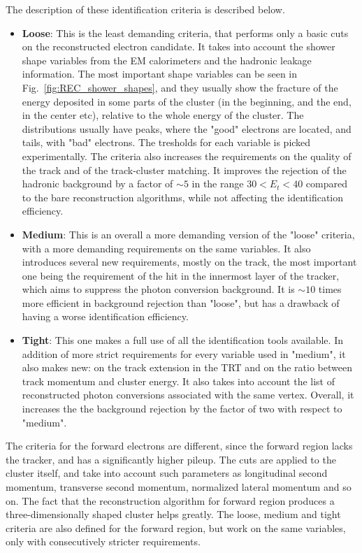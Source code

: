 The description of these identification criteria is described below.
\begin{itemize}
\item {\bfseries Loose}: This is the least demanding criteria, that performs only a basic cuts on the reconstructed electron candidate. It takes into account the shower shape variables from the EM calorimeters and the hadronic leakage information. The most important shape variables can be seen in Fig.~\ref{fig:REC_shower_shapes}, and they usually show the fracture of the energy deposited in some parts of the cluster (in the beginning, and the end, in the center etc), relative to the whole energy of the cluster. The distributions usually have peaks, where the "good" electrons are located, and tails, with "bad" electrons. The tresholds for each variable is picked experimentally. The criteria also increases the requirements on the quality of the track and of the track-cluster matching. It improves the rejection of the hadronic background by a factor of $\sim 5$ in the range $30 < E_{t} < 40$ compared to the bare reconstruction algorithms, while not affecting the identification efficiency.
\item {\bfseries Medium}: This is an overall a more demanding version of the "loose" criteria, with a more demanding requirements on the same variables. It also introduces several new requirements, mostly on the track, the most important one being the requirement of the hit in the innermost layer of the tracker, which aims to suppress the photon conversion background. It is $\sim 10$ times more efficient in background rejection than "loose", but has a drawback of having a worse identification efficiency.
\item {\bfseries Tight}: This one makes a full use of all the identification tools available. In addition of more strict requirements for every variable used in "medium", it also makes new: on the track extension in the TRT and on the ratio between track momentum and cluster energy. It also takes into account the list of reconstructed photon conversions associated with the same vertex. Overall, it increases the the background rejection by the factor of two with respect to "medium".
\end{itemize}

The criteria for the forward electrons are different, since the forward region lacks the tracker, and has a significantly higher pileup. The cuts are applied to the cluster itself, and take into account such parameters as longitudinal second momentum, transverse second momentum, normalized lateral momentum and so on. The fact that the reconstruction algorithm for forward region produces a three-dimensionally shaped cluster helps greatly. The loose, medium and tight criteria are also defined for the forward region, but work on the same variables, only with consecutively stricter requirements.

